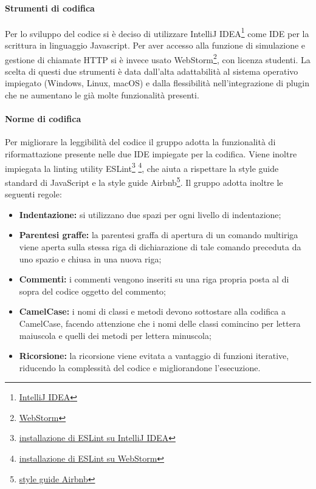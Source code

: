 \paragraph{Strumenti di codifica}
Per lo sviluppo del codice si è deciso di utilizzare IntelliJ IDEA\footnote{\href{https://www.jetbrains.com/idea/}{IntelliJ IDEA}} come IDE per la scrittura in linguaggio Javascript. Per aver accesso alla funzione di simulazione e gestione di chiamate HTTP si è invece usato WebStorm\footnote{\href{https://www.jetbrains.com/webstorm/}{WebStorm}}, con licenza studenti. La scelta di questi due strumenti è data dall'alta adattabilità al sistema operativo impiegato (Windows, Linux, macOS) e dalla flessibilità nell'integrazione di plugin che ne aumentano le già molte funzionalità presenti.

\paragraph{Norme di codifica}
Per migliorare la leggibilità del codice il gruppo \groupName{} adotta la funzionalità di riformattazione presente nelle due IDE impiegate per la codifica. Viene inoltre impiegata la linting utility ESLint\footnote{\href{https://www.jetbrains.com/help/idea/eslint.html}{installazione di ESLint su IntelliJ IDEA}} \footnote{\href{https://www.jetbrains.com/help/webstorm/eslint.html}{installazione di ESLint su WebStorm}}, che aiuta a rispettare la style guide standard di JavaScript e la style guide Airbnb\footnote{\href{https://github.com/airbnb/javascript}{style guide Airbnb}}.
Il gruppo \groupName{} adotta inoltre le seguenti regole:
\begin{itemize}
	\item \textbf{Indentazione: }si utilizzano due spazi per ogni livello di indentazione;
	\item \textbf{Parentesi graffe: }la parentesi graffa di apertura di un comando multiriga viene aperta sulla stessa riga di dichiarazione di tale comando preceduta da uno spazio e chiusa in una nuova riga;
	\item \textbf{Commenti: }i commenti vengono inseriti su una riga propria posta al di sopra del codice oggetto del commento;
	\item \textbf{CamelCase: }i nomi di classi e metodi devono sottostare alla codifica a CamelCase, facendo attenzione che i nomi delle classi comincino per lettera maiuscola e quelli dei metodi per lettera minuscola;
	\item \textbf{Ricorsione: }la ricorsione viene evitata a vantaggio di funzioni iterative, riducendo la complessità del codice e migliorandone l'esecuzione.
\end{itemize}
